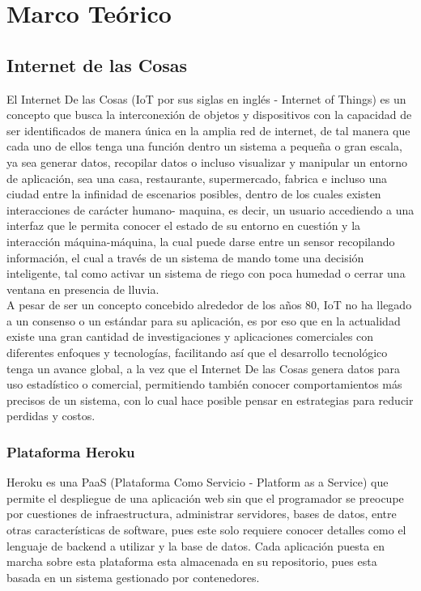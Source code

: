 \chapter{Marco Teórico}

\section{Internet de las Cosas}

El Internet De las Cosas (IoT por sus siglas en inglés - Internet of Things) es un concepto que busca la interconexión de objetos y dispositivos con la capacidad de ser identificados de manera única en la amplia red de internet, de tal manera que cada uno de ellos tenga una función dentro un sistema a pequeña o gran escala, ya sea generar datos, recopilar datos o incluso visualizar y manipular un entorno de aplicación, sea una casa, restaurante, supermercado, fabrica e incluso una ciudad entre la infinidad de escenarios posibles, dentro de los cuales existen interacciones de carácter humano- maquina, es decir, un usuario accediendo a una interfaz que le permita conocer el estado de su entorno en cuestión y la interacción máquina-máquina, la cual puede darse entre un sensor recopilando información, el cual a través de un sistema de mando tome una decisión inteligente, tal como activar un sistema de riego con poca humedad o cerrar una ventana en presencia de lluvia.\cite{TechT2017} \\

A pesar de ser un concepto concebido alrededor de los años 80, IoT no ha llegado a un consenso o un estándar para su aplicación, es por eso que en la actualidad existe una gran cantidad de investigaciones y aplicaciones comerciales con diferentes enfoques y tecnologías, facilitando así que el desarrollo tecnológico tenga un avance global, a la vez que el Internet De las Cosas genera datos para uso estadístico o comercial, permitiendo también conocer comportamientos más precisos de un sistema, con lo cual hace posible pensar en estrategias para reducir perdidas y costos.\cite{Asthon2009} \\


\subsection{Plataforma Heroku}

Heroku es una PaaS (Plataforma Como Servicio - Platform as a Service) que permite el despliegue de una aplicación web sin que el programador se preocupe por cuestiones de infraestructura, administrar servidores, bases de datos, entre otras características de software, pues este solo requiere conocer detalles como el lenguaje de backend a utilizar y  la base de datos. Cada aplicación puesta en marcha sobre esta plataforma esta almacenada en su repositorio, pues esta basada en un sistema gestionado por contenedores.\cite{Hero}\\


